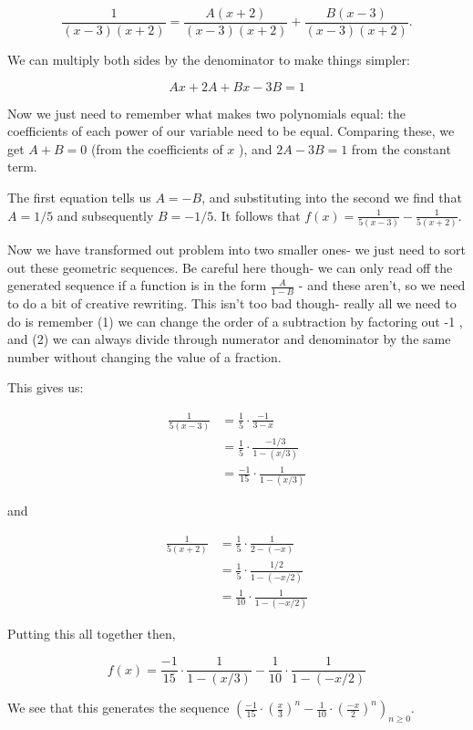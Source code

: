 \documentclass{article}
\begin{document}
$$
\frac{1}{(x-3)(x+2)}=\frac{A(x+2)}{(x-3)(x+2)}+\frac{B(x-3)}{(x-3)(x+2)} .
$$

We can multiply both sides by the denominator to make things simpler:

$$
A x+2 A+B x-3 B=1
$$

Now we just need to remember what makes two polynomials equal: the coefficients of each power of our variable need to be equal. Comparing these, we get $A+B=0$ (from the coefficients of $x$ ), and $2 A-3 B=1$ from the constant term.

The first equation tells us $A=-B$, and substituting into the second we find that $A=1 / 5$ and subsequently $B=-1 / 5$. It follows that $f(x)=\frac{1}{5(x-3)}-\frac{1}{5(x+2)}$.

Now we have transformed out problem into two smaller ones- we just need to sort out these geometric sequences. Be careful here though- we can only read off the generated sequence if a function is in the form $\frac{A}{1-B}$ - and these aren't, so we need to do a bit of creative rewriting. This isn't too bad though- really all we need to do is remember (1) we can change the order of a subtraction by factoring out -1 , and (2) we can always divide through numerator and denominator by the same number without changing the value of a fraction.

This gives us:

$$
\begin{aligned}
\frac{1}{5(x-3)} & =\frac{1}{5} \cdot \frac{-1}{3-x} \\
& =\frac{1}{5} \cdot \frac{-1 / 3}{1-(x / 3)} \\
& =\frac{-1}{15} \cdot \frac{1}{1-(x / 3)}
\end{aligned}
$$

and

$$
\begin{aligned}
\frac{1}{5(x+2)} & =\frac{1}{5} \cdot \frac{1}{2-(-x)} \\
& =\frac{1}{5} \cdot \frac{1 / 2}{1-(-x / 2)} \\
& =\frac{1}{10} \cdot \frac{1}{1-(-x / 2)}
\end{aligned}
$$

Putting this all together then,

$$
f(x)=\frac{-1}{15} \cdot \frac{1}{1-(x / 3)}-\frac{1}{10} \cdot \frac{1}{1-(-x / 2)}
$$

We see that this generates the sequence $\left(\frac{-1}{15} \cdot\left(\frac{x}{3}\right)^{n}-\frac{1}{10} \cdot\left(\frac{-x}{2}\right)^{n}\right)_{n \geq 0}$.
\end{document}

